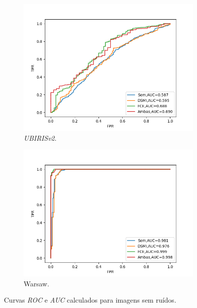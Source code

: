 \begin{figure}[h!]
\medskip
\begin{subfigure}{0.35\textwidth}
  \includegraphics[width=\linewidth]{img/Resultados/ubirisv2_inter_nodistortion_auc.png}
  \caption{\textit{UBIRISv2}.}
\end{subfigure}\hfil %
\begin{subfigure}{0.35\textwidth}
  \includegraphics[width=\linewidth]{img/Resultados/warsaw_inter_nodistortion_auc.png}
  \caption{{\acrshort{Warsaw}}.}
\end{subfigure}\hfil %
\caption{Curvas \textit{\acrshort{ROC}} e \textit{\acrshort{AUC}} calculados para imagens sem ruídos.}
\label{fig:experimentos:roc_semruidos}
\end{figure}

